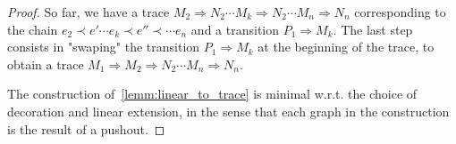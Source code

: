 \begin{proof}
  So far, we have a trace $M_2\Rightarrow N_2\cdots M_k\Rightarrow N_2\cdots M_n\Rightarrow N_n$ corresponding to the chain $e_2\prec e'\cdots e_k\prec e''\prec\cdots e_n$ and a transition $P_1\Rightarrow M_k$. The last step consists in "swaping" the transition $P_1\Rightarrow M_k$ at the beginning of the trace, to obtain a trace $M_1\Rightarrow M_2\Rightarrow N_2\cdots M_n\Rightarrow N_n$.


  The construction of~\autoref{lemm:linear_to_trace} is minimal w.r.t. the choice of decoration and linear extension, in the sense that each graph in the construction is the result of a pushout.

\end{proof}




\newpage

